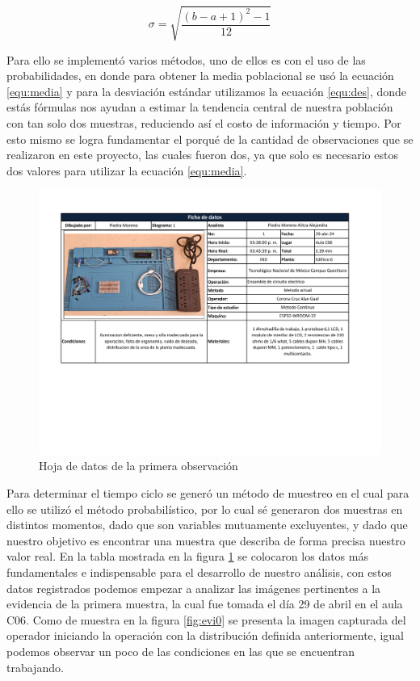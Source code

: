       \begin{equation}
            \label{equ:des}
            \sigma = \sqrt{\dfrac{(b-a+1)^2-1}{12}}
        \end{equation}
    
    
    
    Para ello se implementó varios métodos, uno de ellos es con el uso de las probabilidades, en donde para obtener la media poblacional se usó la ecuación \ref{equ:media} y para  la desviación estándar utilizamos la ecuación \ref{equ:des}, donde estás fórmulas nos ayudan a estimar la tendencia central de nuestra población con tan solo dos muestras, reduciendo así el costo de información y tiempo. Por esto mismo se logra fundamentar el porqué de la cantidad de observaciones que se realizaron en este proyecto, las cuales fueron dos, ya que solo es necesario estos dos valores para utilizar la ecuación \ref{equ:media}.
       
    \begin{figure}[H]
        \centering
        \includegraphics[trim = {17mm 70mm 25mm 15mm},clip,scale=0.35]{22/Img/hojaDeDatos1.pdf}
        \caption{Hoja de datos de la primera observación}
        \label{fig:hoja1}
    \end{figure}
    
    
    Para determinar el tiempo ciclo se generó un método de muestreo en el cual para ello se utilizó el método probabilístico, por lo cual sé generaron dos muestras en distintos momentos, dado que son variables mutuamente excluyentes, y dado que nuestro objetivo es encontrar una muestra que describa de forma precisa nuestro valor real. En la tabla mostrada en la figura \ref{fig:hoja1} se colocaron los datos más fundamentales e indispensable para el desarrollo de nuestro análisis, con estos datos registrados podemos empezar a analizar las imágenes pertinentes a la evidencia de la primera muestra, la cual fue tomada el día 29 de abril en el aula C06. Como de muestra en la figura \ref{fig:evi0} se presenta la imagen capturada del operador iniciando la operación con la distribución definida anteriormente, igual podemos observar un poco de las condiciones en las que se encuentran trabajando. 
    
